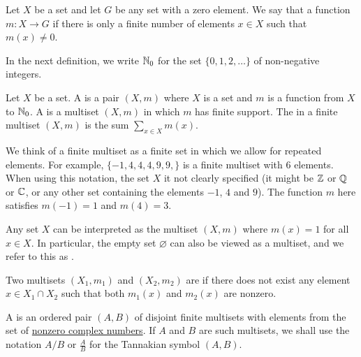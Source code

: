 \begin{definition}
Let $X$ be a set and let $G$ be any set with a zero element. We say that a function $m: X \to G$  if there is only a finite number of elements $x \in X$ such that $m(x) \neq 0$. 
\end{definition}

In the next definition, we write $\mathbb{N}_0$ for the set $\{  0, 1, 2, \ldots  \}$ of non-negative integers.

\begin{definition}
Let $X$ be a set. A  is a pair $(X, m)$ where $X$ is a set and $m$ is a function from $X$ to $\mathbb{N}_0$. A  is a multiset $(X, m)$ in which $m$ has finite support. The  in a finite multiset $(X, m)$ is the sum $\sum_{x \in X} m(x)$.
\end{definition}

\begin{example}
We think of a finite multiset as a finite set in which we allow for repeated elements. For example, $\{ -1, 4, 4, 4, 9, 9,   \}$ is a finite multiset with 6 elements. When using this notation, the set $X$ it not clearly specified (it might be $\mathbb{Z}$ or $\mathbb{Q}$ or $\mathbb{C}$, or any other set containing the elements $-1$, $4$ and $9$). The function $m$ here satisfies $m(-1) = 1$ and $m(4) = 3$.
\end{example}

\begin{example}
Any set $X$ can be interpreted as the multiset $(X, m)$ where $m(x) = 1$ for all $x \in X$. In particular, the empty set $\varnothing$ can also be viewed as a multiset, and we refer to this as .
\end{example}

\begin{definition}
Two multisets $(X_1, m_1)$ and $(X_2, m_2)$ are  if there does not exist any element $x \in X_1 \cap X_2$ such that both $m_1(x)$ and $m_2(x)$ are nonzero.
\end{definition}

\begin{definition}
A  is an ordered pair $(A, B)$ of disjoint finite multisets with elements from the set of \underline{nonzero complex numbers}. If $A$ and $B$ are such multisets, we shall use the notation $A/B$ or $\frac{A}{B}$ for the Tannakian symbol $(A, B)$.
\end{definition}



